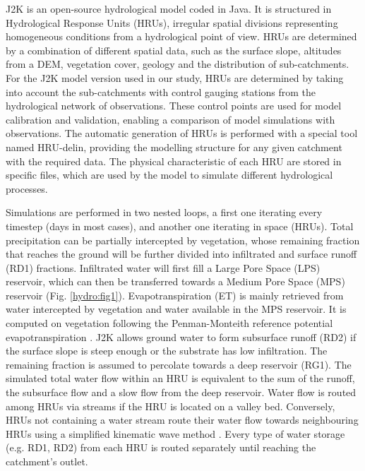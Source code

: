 J2K is an open-source hydrological model coded in Java. It is structured in Hydrological Response Units (HRUs), irregular spatial divisions representing homogeneous conditions from a hydrological point of view. HRUs are determined by a combination of different spatial data, such as the surface slope, altitudes from a DEM, vegetation cover, geology and the distribution of sub-catchments. For the J2K model version used in our study, HRUs are determined by taking into account the sub-catchments with control gauging stations from the hydrological network of observations. These control points are used for model calibration and validation, enabling a comparison of model simulations with observations. The automatic generation of HRUs is performed with a special tool named HRU-delin, providing the modelling structure for any given catchment with the required data. The physical characteristic of each HRU are stored in specific files, which are used by the model to simulate different hydrological processes. 

Simulations are performed in two nested loops, a first one iterating every timestep (days in most cases), and another one iterating in space (HRUs). Total precipitation can be partially intercepted by vegetation, whose remaining fraction that reaches the ground will be further divided into infiltrated and surface runoff (RD1) fractions. Infiltrated water will first fill a Large Pore Space (LPS) reservoir, which can then be transferred towards a Medium Pore Space (MPS) reservoir (Fig. \ref{hydro:fig1}). Evapotranspiration (ET) is mainly retrieved from water intercepted by vegetation and water available in the MPS reservoir. It is computed on vegetation following the Penman-Monteith reference potential evapotranspiration \citep{howell_penman-monteith_2004}. J2K allows ground water to form subsurface runoff (RD2) if the surface slope is steep enough or the substrate has low infiltration. The remaining fraction is assumed to percolate towards a deep reservoir (RG1). The simulated total water flow within an HRU is equivalent to the sum of the runoff, the subsurface flow and a slow flow from the deep reservoir. Water flow is routed among HRUs via streams if the HRU is located on a valley bed. Conversely, HRUs not containing a water stream route their water flow towards neighbouring HRUs using a simplified kinematic wave method \citep{chen_surface_1970}. Every type of water storage (e.g. RD1, RD2) from each HRU is routed separately until reaching the catchment's outlet. 

